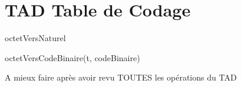 \documentclass[10pt]{article}
\begin{document}
\section{TAD Table de Codage}

\begin{tad}
    \begin{tadOperations}{octetVersNaturel}
       
       
    \end{tadOperations}

    \begin{tadPreconditions}{octetVersCodeBinaire(t, codeBinaire)}
    \end{tadPreconditions}

    \begin{tadAxiomes}{}
        A mieux faire 	après avoir revu TOUTES les opérations du TAD
    \end{tadAxiomes}

\end{tad}
\end{document}

